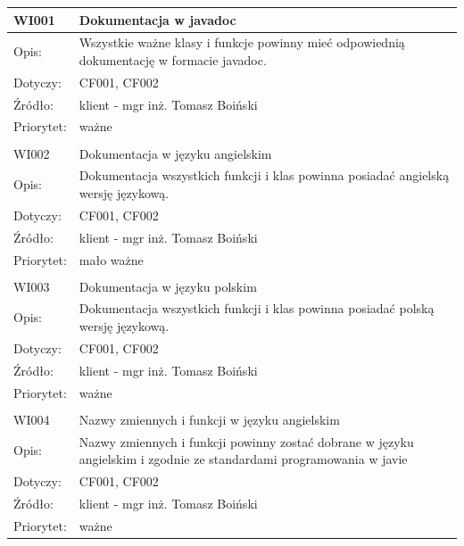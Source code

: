 \begin{center}

\begin{tabular}{|m{3cm}|m{9cm}|} \hline

WI001 & Dokumentacja w javadoc \\ \hline
Opis: & Wszystkie ważne klasy i funkcje powinny mieć odpowiednią dokumentację w formacie javadoc.\\ \hline
Dotyczy: & CF001, CF002 \\ \hline
Źródło: & klient - mgr inż. Tomasz Boiński \\ \hline
Priorytet: & ważne \\ \hline

\multicolumn{2}{c}{} \\
 \hline

WI002 & Dokumentacja w języku angielskim \\ \hline
Opis: & Dokumentacja wszystkich funkcji i klas powinna posiadać angielską wersję językową.\\ \hline
Dotyczy: & CF001, CF002 \\ \hline
Źródło: & klient - mgr inż. Tomasz Boiński \\ \hline
Priorytet: & mało ważne \\ \hline

\multicolumn{2}{c}{} \\
 \hline

WI003 & Dokumentacja w języku polskim \\ \hline
Opis: & Dokumentacja wszystkich funkcji i klas powinna posiadać polską wersję językową. \\ \hline
Dotyczy: & CF001, CF002 \\ \hline
Źródło: & klient - mgr inż. Tomasz Boiński \\ \hline
Priorytet: & ważne \\ \hline

\multicolumn{2}{c}{} \\
 \hline
WI004 & Nazwy zmiennych i funkcji w języku angielskim \\ \hline
Opis: & Nazwy zmiennych i funkcji powinny zostać dobrane w języku angielskim i zgodnie ze standardami programowania w javie %
\\ \hline
Dotyczy: & CF001, CF002 \\ \hline
Źródło: & klient - mgr inż. Tomasz Boiński \\ \hline
Priorytet: & ważne \\ \hline

\end{tabular}

\end{center}

